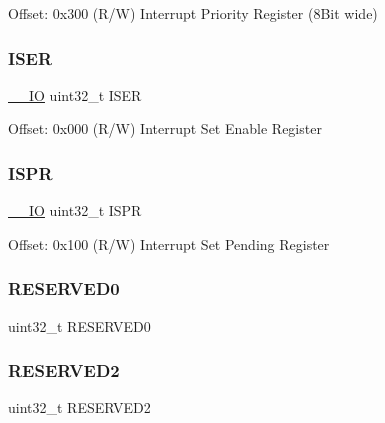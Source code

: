 Offset\+: 0x300 (R/W) Interrupt Priority Register (8Bit wide) \mbox{\label{struct_n_v_i_c___type_a95686b1da7037feece357d91ba5f5325}} 
\subsubsection{\texorpdfstring{ISER}{ISER}}
{\footnotesize\ttfamily \mbox{\hyperlink{core__sc300_8h_aec43007d9998a0a0e01faede4133d6be}{\+\_\+\+\_\+\+IO}} uint32\+\_\+t I\+S\+ER}

Offset\+: 0x000 (R/W) Interrupt Set Enable Register \mbox{\label{struct_n_v_i_c___type_ae3434eff1b1db4ce857c73a4ef1af273}} 
\subsubsection{\texorpdfstring{ISPR}{ISPR}}
{\footnotesize\ttfamily \mbox{\hyperlink{core__sc300_8h_aec43007d9998a0a0e01faede4133d6be}{\+\_\+\+\_\+\+IO}} uint32\+\_\+t I\+S\+PR}

Offset\+: 0x100 (R/W) Interrupt Set Pending Register \mbox{\label{struct_n_v_i_c___type_a148e6e212dc15628998e8f4239290665}} 
\subsubsection{\texorpdfstring{RESERVED0}{RESERVED0}}
{\footnotesize\ttfamily uint32\+\_\+t R\+E\+S\+E\+R\+V\+E\+D0}

\mbox{\label{struct_n_v_i_c___type_a6e578ce633e8b80c70bc612a1bf8a965}} 
\subsubsection{\texorpdfstring{RESERVED2}{RESERVED2}}
{\footnotesize\ttfamily uint32\+\_\+t R\+E\+S\+E\+R\+V\+E\+D2}

\mbox{\label{struct_n_v_i_c___type_afbefcd166e59396eadde34d46bfc4539}} 

